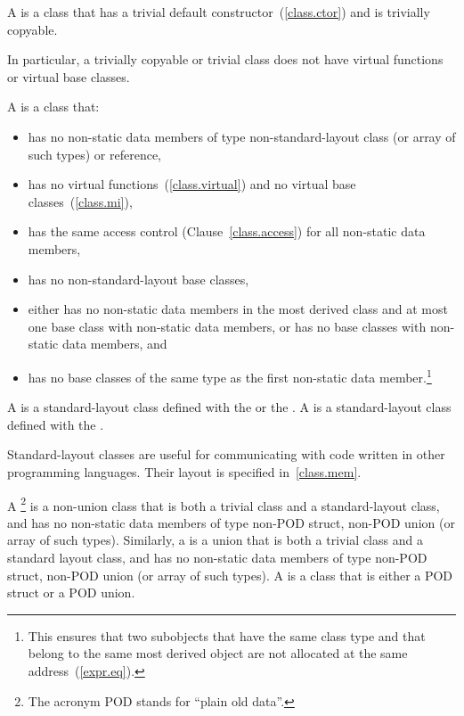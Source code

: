 A  is a class that has a trivial default constructor~(\ref{class.ctor}) and is trivially copyable.

\enternote In particular, a trivially copyable or trivial class does not have
virtual functions or virtual base classes.\exitnote

%
%
\pnum
A  is a class that:
\begin{itemize}
\item has no non-static data members of type non-standard-layout class
(or array of such types) or reference,

\item has no virtual functions~(\ref{class.virtual}) and no
virtual base classes~(\ref{class.mi}),

\item has the same access control (Clause~\ref{class.access})
for all non-static data members,

\item has no non-standard-layout base classes,

\item either has no non-static data members in the most derived class
and at most one base class with non-static data members, or has no base
classes with non-static data members, and

\item has no base classes of the same type as the first non-static
data member.\footnote{This ensures that two subobjects that have the
same class type and that
belong to the same most derived object are not allocated at the same
address~(\ref{expr.eq}).}
\end{itemize}

%
%
%
%
\pnum
A  is a standard-layout class
defined with the   or the
 .
A  is a standard-layout class
defined with the
 .

\pnum
\enternote Standard-layout classes are useful for communicating with
code written in other programming languages. Their layout is specified
in~\ref{class.mem}.\exitnote

\pnum
{}%
A \footnote{The acronym POD stands for ``plain old data''.}
is a non-union class that is both a trivial class and a
standard-layout class, and has no non-static data members of type non-POD struct,
non-POD union (or array of such types). Similarly, a
 is a union that is both a trivial class and a standard
layout class, and has no non-static data members of type non-POD struct, non-POD
union (or array of such types). A  is a
class that is either a POD struct or a POD union.

